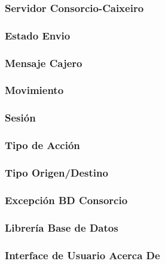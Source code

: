 \documentclass[a4paper,titlepage]{article}
\begin{document}
\subsubsection{Servidor Consorcio-Caixeiro}

\subsubsection{Estado Envio}

\subsubsection{Mensaje Cajero}

\subsubsection{Movimiento}

\subsubsection{Sesión}

\subsubsection{Tipo de Acción}

\subsubsection{Tipo Origen/Destino}

\subsubsection{Excepción BD Consorcio}

\subsubsection{Librería Base de Datos}

\subsubsection{Interface de Usuario Acerca De}

\end{document}
